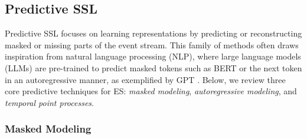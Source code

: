 \documentclass[twoside,11pt]{article}
\begin{document}
\subsection{Predictive SSL}
\label{subsec:predictive-ssl}

Predictive SSL focuses on learning representations by predicting or reconstructing masked or missing parts of the event stream. This family of methods often draws inspiration from natural language processing (NLP), where large language models (LLMs) are pre-trained to predict masked tokens such as BERT  or the next token in an autoregressive manner, as exemplified by GPT . Below, we review three core predictive techniques for ES: \textit{masked modeling}, \textit{autoregressive modeling}, and \textit{temporal point processes}.

\subsubsection{Masked Modeling}
\label{subsubsec:masked-modeling}
\end{document}
